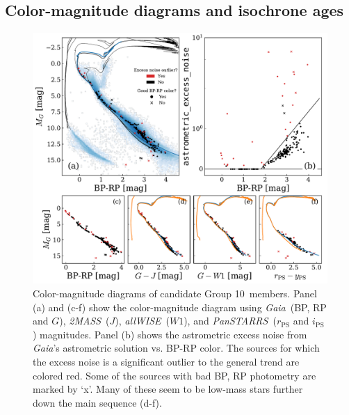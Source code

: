 \documentclass[modern,letterpaper]{aastex61}
\newcommand{\project}[1]{\textsl{#1}}
\newcommand{\acronym}[1]{{\small{#1}}}
\newcommand{\gaia}{\project{Gaia}}
\newcommand{\tmass}{\project{\acronym{2MASS}}}
\newcommand{\allwise}{\project{\acronym{allWISE}}}
\newcommand{\panstarrs}{\project{\acronym{PanSTARRS}}}
\newcommand{\groupTen}{Group 10}
\begin{document}
%
%
%
%


\subsection{Color-magnitude diagrams and isochrone ages}

\begin{figure}
  \includegraphics[width=0.95\linewidth]{bp_rp_G.pdf}
  \caption{
    Color-magnitude diagrams of candidate \groupTen\ members.
    Panel (a) and (c-f) show the color-magnitude diagram using \gaia\ (BP, RP and $G$),
    \tmass\ ($J$), \allwise\ ($W1$), and \panstarrs\ ($r_\mathrm{PS}$ and $i_\mathrm{PS}$)
    magnitudes. Panel (b) shows the astrometric excess noise from \gaia's astrometric
    solution vs. BP-RP color. The sources for which the excess noise is a significant
    outlier to the general trend are colored red.
    Some of the sources with bad BP, RP photometry are marked by `x'.
    Many of these seem to be low-mass stars further down the main sequence (d-f).
  }
  \label{fig:cmd}
\end{figure}
\end{document}
